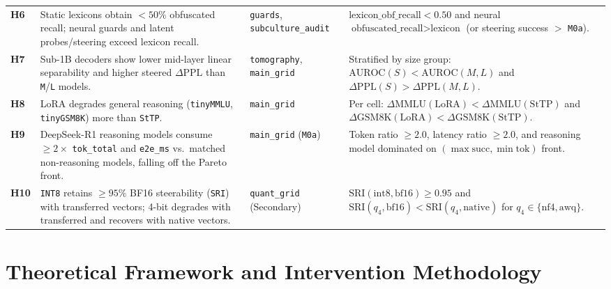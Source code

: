 \documentclass[11pt,letterpaper]{article}
\begin{document}
\begin{table}[ht]
\begin{tabular}{p{} p{} p{} p{}}
\textbf{H6} & Static lexicons obtain $< 50\%$ obfuscated recall; neural guards and latent probes/steering exceed lexicon recall. & \texttt{guards}, \texttt{subculture\_audit} & $\text{lexicon\_obf\_recall} < 0.50$ and neural $\text{obfuscated\_recall} > \text{lexicon}$ (or steering success $>$ \texttt{M0a}). \\
\textbf{H7} & Sub-1B decoders show lower mid-layer linear separability and higher steered $\Delta\text{PPL}$ than \texttt{M}/\texttt{L} models. & \texttt{tomography}, \texttt{main\_grid} & Stratified by size group: $\text{AUROC}(S) < \text{AUROC}(M, L)$ and $\Delta\text{PPL}(S) > \Delta\text{PPL}(M, L)$. \\
\textbf{H8} & LoRA degrades general reasoning (\texttt{tinyMMLU}, \texttt{tinyGSM8K}) more than \texttt{StTP}. & \texttt{main\_grid} & Per cell: $\Delta\text{MMLU}(\text{LoRA}) < \Delta\text{MMLU}(\text{StTP})$ and $\Delta\text{GSM8K}(\text{LoRA}) < \Delta\text{GSM8K}(\text{StTP})$. \\
\textbf{H9} & DeepSeek-R1 reasoning models consume $\ge 2\times$ \texttt{tok\_total} and \texttt{e2e\_ms} vs.\ matched non-reasoning models, falling off the Pareto front. & \texttt{main\_grid} (\texttt{M0a}) & Token ratio $\ge 2.0$, latency ratio $\ge 2.0$, and reasoning model dominated on $(\max \text{succ}, \min \text{tok})$ front. \\
\textbf{H10} & \texttt{INT8} retains $\ge 95\%$ BF16 steerability (\texttt{SRI}) with transferred vectors; 4-bit degrades with transferred and recovers with native vectors. & \texttt{quant\_grid} (Secondary) & $\text{SRI}(\text{int8}, \text{bf16}) \ge 0.95$ and $\text{SRI}(q_4, \text{bf16}) < \text{SRI}(q_4, \text{native})$ for $q_4 \in \{\text{nf4}, \text{awq}\}$. \\
\bottomrule
\end{tabular}
\end{table}

\section{Theoretical Framework and Intervention Methodology}
\end{document}
